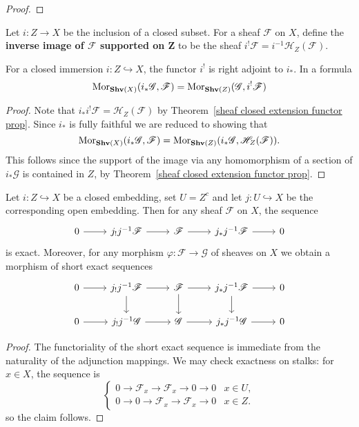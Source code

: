 \begin{proof}

\end{proof}
\begin{definition}
Let $i:Z\to X$ be the inclusion of a closed subset. For a sheaf $\mathscr{F}$ on $X$, define the \textbf{inverse image of $\mathscr{F}$ supported on $\bm{Z}$} to be the sheaf $i^!\mathscr{F}=i^{-1}\mathscr{H}_Z(\mathscr{F})$.
\end{definition}
\begin{proposition}
For a closed immersion $i:Z\hookrightarrow X$, the functor $i^!$ is right adjoint to $i_*$. In a formula
\[\mathrm{Mor}_{\mathbf{Shv}(X)}(i_*\mathscr{G},\mathscr{F})=\mathrm{Mor}_{\mathbf{Shv}(Z)}(\mathscr{G},i^!\mathscr{F})\]
\end{proposition}
\begin{proof}
Note that $i_*i^!\mathscr{F}=\mathscr{H}_Z(\mathscr{F})$ by Theorem~\ref{sheaf closed extension functor prop}. Since $i_*$ is fully faithful we are reduced to showing that
\[\mathrm{Mor}_{\mathbf{Shv}(X)}(i_*\mathscr{G},\mathscr{F})=\mathrm{Mor}_{\mathbf{Shv}(Z)}(i_*\mathscr{G},\mathscr{H}_Z(\mathscr{F})).\]
This follows since the support of the image via any homomorphism of a section of $i_*\mathscr{G}$ is contained in $Z$, by Theorem~\ref{sheaf closed extension functor prop}.
\end{proof}
\begin{proposition}
Let $i:Z\hookrightarrow X$ be a closed embedding, set $U=Z^c$ and let $j:U\hookrightarrow X$ be the corresponding open embedding. Then for any sheaf $\mathscr{F}$ on $X$, the sequence
\[\begin{tikzcd}
0\ar[r]&j_!j^{-1}\mathscr{F}\ar[r]&\mathscr{F}\ar[r]&j_*j^{-1}\mathscr{F}\ar[r]&0
\end{tikzcd}\]
is exact. Moreover, for any morphism $\varphi:\mathscr{F}\to\mathscr{G}$ of sheaves on $X$ we obtain a morphism of short exact sequences
\[\begin{tikzcd}
0\ar[r]&j_!j^{-1}\mathscr{F}\ar[r]\ar[d]&\mathscr{F}\ar[r]\ar[d]&j_*j^{-1}\mathscr{F}\ar[r]\ar[d]&0\\
0\ar[r]&j_!j^{-1}\mathscr{G}\ar[r]&\mathscr{G}\ar[r]&j_*j^{-1}\mathscr{G}\ar[r]&0
\end{tikzcd}\]
\end{proposition}
\begin{proof}
The functoriality of the short exact sequence is immediate from the naturality of the adjunction mappings. We may check exactness on stalks: for $x\in X$, the sequence is
\[\begin{cases}
0\to\mathscr{F}_x\to\mathscr{F}_x\to 0\to 0&x\in U,\\
0\to0\to\mathscr{F}_x\to \mathscr{F}_x\to 0&x\in Z.
\end{cases}\]
so the claim follows.
\end{proof}
